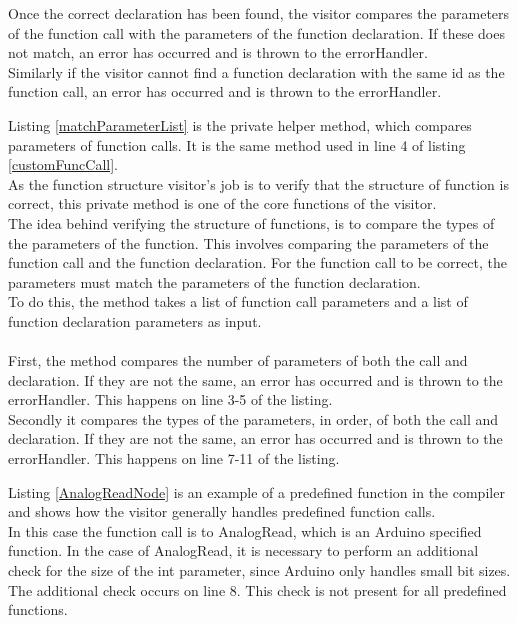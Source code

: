 Once the correct declaration has been found, the visitor compares the parameters of the function call with the parameters of the function declaration. If these does not match, an error has occurred and is thrown to the errorHandler.\\
Similarly if the visitor cannot find a function declaration with the same id as the function call, an error has occurred and is thrown to the errorHandler.

\noindent\newline
Listing \ref{matchParameterList} is the private helper method, which compares parameters of function calls. It is the same method used in line 4 of listing \ref{customFuncCall}.\\
As the function structure visitor's job is to verify that the structure of function is correct, this private method is one of the core functions of the visitor.\\
The idea behind verifying the structure of functions, is to compare the types of the parameters of the function. This involves comparing the parameters of the function call and the function declaration. For the function call to be correct, the parameters must match the parameters of the function declaration.\\
To do this, the method takes a list of function call parameters and a list of function declaration parameters as input.
\\\\
First, the method compares the number of parameters of both the call and declaration. If they are not the same, an error has occurred and is thrown to the errorHandler. This happens on line 3-5 of the listing.\\
Secondly it compares the types of the parameters, in order, of both the call and declaration. If they are not the same, an error has occurred and is thrown to the errorHandler. This happens on line 7-11 of the listing.

\noindent\newline
Listing \ref{AnalogReadNode} is an example of a predefined function in the compiler and shows how the visitor generally handles predefined function calls.\\
In this case the function call is to AnalogRead, which is an Arduino specified function. In the case of AnalogRead, it is necessary to perform an additional check for the size of the int parameter, since Arduino only handles small bit sizes. The additional check occurs on line 8. This check is not present for all predefined functions.
